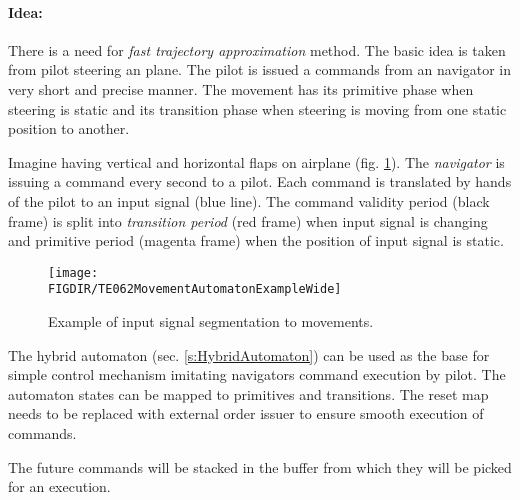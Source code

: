 \setcounter{chapter}{8}
\setcounter{section}{3}
\setcounter{subsection}{0}
\paragraph{Idea:} There is  a need for \emph{fast trajectory approximation} method. The basic idea is taken from pilot steering an plane. The pilot is issued a commands from an navigator in very short and precise manner. The movement has its primitive phase when steering is static and its transition phase when steering is moving from one static position to another. 

Imagine having vertical and horizontal flaps on airplane (fig. \ref{fig:movementsExample}). The \emph{navigator} is issuing a command every second to a pilot. Each command is translated by hands of the pilot to an input signal (blue line). The command validity period (black frame) is split into \emph{transition period} (red frame) when input signal is changing and primitive period (magenta frame) when the position of input signal is static.
 
\begin{figure}[H]
    \centering
    \texttt{[image: \\FIGDIR/TE062MovementAutomatonExampleWide]} 
    \caption{Example of input signal segmentation to movements.}
    \label{fig:movementsExample}
\end{figure}

\begin{note}
    The hybrid automaton (sec. \ref{s:HybridAutomaton}) can be used as the base for simple control mechanism imitating navigators command execution by pilot. The automaton states can be mapped to primitives and transitions. The reset map needs to be replaced with external order issuer to ensure smooth execution of commands.
    
    The future commands will be stacked in the buffer from which they will be picked for an execution.
\end{note}